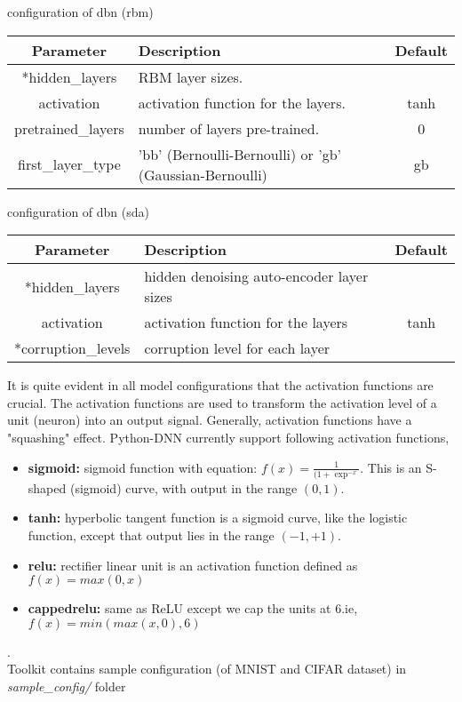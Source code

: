 \begin{table}[!htbp] 
 \begin{center}
  	\medskip  \small configuration of dbn (rbm)
	\begin{tabular}{|c|p{8cm}|c|} \hline
   	\textbf{Parameter} & \textbf{Description} & \textbf{Default}\\  \hline
	*hidden\_layers &  RBM layer sizes. & \\ \hline
	activation & activation function for the layers. & tanh \\ \hline
	pretrained\_layers & number of layers  pre-trained. & 0 \\ \hline
	first\_layer\_type & 'bb' (Bernoulli-Bernoulli) or 'gb' (Gaussian-Bernoulli) & gb  \\ 	\hline 
	\end{tabular}		
\end{center}
\end{table} 
\begin{table}[!htbp] 
 \begin{center}
  	\medskip  \small configuration of dbn (sda)
	\begin{tabular}{|c|p{8cm}|c|} \hline
   	\textbf{Parameter} & \textbf{Description} & \textbf{Default}\\  \hline
	*hidden\_layers &  hidden denoising auto-encoder layer sizes & \\ \hline
	activation & activation function for the layers & tanh \\ \hline
	*corruption\_levels & corruption level for each layer &  \\ \hline
	\end{tabular}		
\end{center} 
\end{table} 
\noindent It is quite evident in all model configurations that the activation functions are crucial.  The activation functions are used to transform the activation level of a unit (neuron) into an output signal.  Generally, activation functions have a "squashing" effect.  Python-DNN currently support following activation functions,
\begin{itemize}
\item {\textbf{sigmoid:} sigmoid function with equation: $f(x) = \frac{1}{(1 + \exp^{-x}}$.  This is an S-shaped (sigmoid) curve, with output in the range $(0,1)$.}
\item {\textbf{tanh:} hyperbolic tangent function is a sigmoid curve, like the logistic function, except that output lies in the range $(-1,+1)$.} 
\item {\textbf{relu:} rectifier linear unit is an activation function defined as $f(x) = max(0, x)$}
\item {\textbf{cappedrelu:} same as ReLU except we cap the units at 6.ie, $f(x) = min(max(x,0),6)$}
\end{itemize}
.\\
Toolkit contains sample configuration (of MNIST and CIFAR dataset) in \textit{sample\_config/} folder
\clearpage

